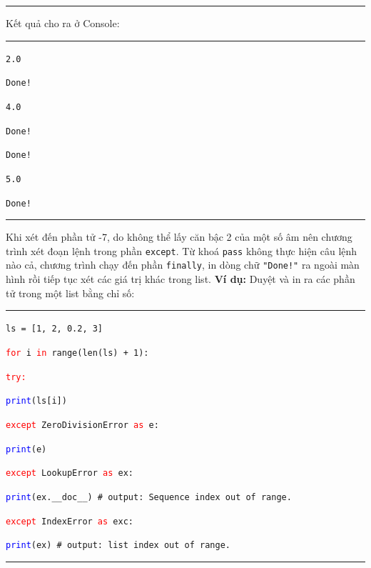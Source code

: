 \rule{\linewidth}{0.2mm}\par
\noindent
\resetlinenumber
Kết quả cho ra ở Console:\\
\rule{\linewidth}{0.2mm}\par
\begin{linenumbers}
	\texttt{2.0}\par
	\texttt{Done!}\par
	\texttt{4.0}\par
	\texttt{Done!}\par
	\texttt{Done!}\par
	\texttt{5.0}\par
	\texttt{Done!}\par
\end{linenumbers}
\rule{\linewidth}{0.2mm}\par
\resetlinenumber
Khi xét đến phần tử -7, do không thể lấy căn bậc 2 của một số âm nên chương trình xét đoạn lệnh trong phần \texttt{except}. Từ khoá \texttt{pass} không thực hiện câu lệnh nào cả, chương trình chạy đến phần \texttt{finally}, in dòng chữ \texttt{"Done!"} ra ngoài màn hình rồi tiếp tục xét các giá trị khác trong list.
\newpage
\textbf{Ví dụ:} Duyệt và in ra các phần tử trong một list bằng chỉ số:\\
\rule{\linewidth}{0.2mm}\par
\begin{linenumbers}
	\texttt{ls = [1, 2, 0.2, 3]}\par
	\texttt{\textcolor{red}{for} i \textcolor{red}{in} range(len(ls) + 1):}\par
	\qquad\texttt{\textcolor{red}{try:}}\par
	\qquad\qquad\texttt{\textcolor{blue}{print}(ls[i])}\par
	\qquad\texttt{\textcolor{red}{except} ZeroDivisionError \textcolor{red}{as} e:}\par
	\qquad\qquad\texttt{\textcolor{blue}{print}(e)}\par
	\qquad\texttt{\textcolor{red}{except} LookupError \textcolor{red}{as} ex:}\par
	\qquad\qquad\texttt{\textcolor{blue}{print}(ex.\_\_doc\_\_)  \# output: Sequence index out of range.}\par
	\qquad\texttt{\textcolor{red}{except} IndexError \textcolor{red}{as} exc:}\par
	\qquad\qquad\texttt{\textcolor{blue}{print}(ex)  \# output: list index out of range.}\par
\end{linenumbers}
\rule{\linewidth}{0.2mm}\par
